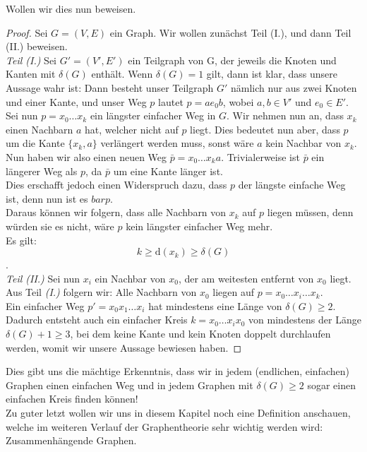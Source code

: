\documentclass{article}
\begin{document}
Wollen wir dies nun beweisen.\\
\begin{proof}
	Sei $G = (V, E)$ ein Graph. Wir wollen zunächst Teil (I.), und dann Teil (II.) beweisen.\\
	\emph{Teil (I.)} Sei $G' = (V', E')$ ein Teilgraph von G, der jeweils die Knoten und Kanten mit $\delta(G)$ enthält. Wenn $\delta(G) = 1$ gilt, dann ist klar, dass unsere Aussage wahr ist: Dann besteht unser Teilgraph $G'$ nämlich nur aus zwei Knoten und einer Kante, und unser Weg $p$ lautet $p = ae_0b$, wobei $a, b \in V'$ und $e_0 \in E'$.\\
	Sei nun $p = x_0 \ldots x_k$ ein längster einfacher Weg in $G$. Wir nehmen nun an, dass $x_k$ einen Nachbarn $a$ hat, welcher nicht auf $p$ liegt. Dies bedeutet nun aber, dass $p$ um die Kante $\{x_k, a\}$ verlängert werden muss, sonst wäre $a$ kein Nachbar von $x_k$.\\
	Nun haben wir also einen neuen Weg $\bar{p} = x_0 \ldots x_k a$. Trivialerweise ist $\bar{p}$ ein längerer Weg als $p$, da $\bar{p}$ um eine Kante länger ist.\\
	Dies erschafft jedoch einen Widerspruch dazu, dass $p$ der längste einfache Weg ist, denn nun ist es $bar{p}$.\\
	\Rightarrow Daraus können wir folgern, dass alle Nachbarn von $x_k$ auf $p$ liegen müssen, denn würden sie es nicht, wäre $p$ kein längster einfacher Weg mehr.\\
	\Rightarrow Es gilt: $$k \ge \text{d}(x_k) \geq \delta(G)$$.\\
	\emph{Teil (II.)} Sei nun $x_i$ ein Nachbar von $x_0$, der am weitesten entfernt von $x_0$ liegt. %
	Aus Teil \emph{(I.)} folgern wir: Alle Nachbarn von $x_0$ liegen auf $p = x_0 \ldots x_i \ldots x_k$.\\
	\Rightarrow Ein einfacher Weg $p' = x_0 x_1 \ldots x_i$ hat mindestens eine Länge von $\delta(G) \geq 2$.\\
	\Rightarrow Dadurch entsteht auch ein einfacher Kreis $k = x_0 \ldots x_i x_0$ von mindestens der Länge $\delta(G) + 1 \geq 3$, bei dem keine Kante und kein Knoten doppelt durchlaufen werden, womit wir unsere Aussage bewiesen haben.
\end{proof}
Dies gibt uns die mächtige Erkenntnis, dass wir in jedem (endlichen, einfachen) Graphen einen einfachen Weg und in jedem Graphen mit $\delta(G) \geq 2$ sogar einen einfachen Kreis finden können!\\
\bigskip
Zu guter letzt wollen wir uns in diesem Kapitel noch eine Definition anschauen, welche im weiteren Verlauf der Graphentheorie sehr wichtig werden wird: Zusammenhängende Graphen.\\
\end{document}
